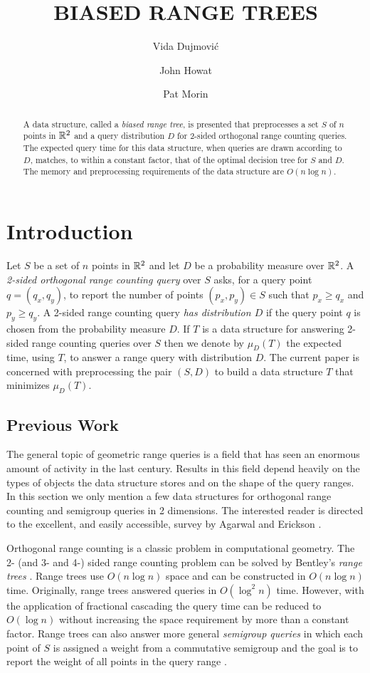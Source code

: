 \documentclass[lotsofwhite,charterfonts]{patmorin}
\title{\MakeUppercase{Biased Range Trees}}
\author{Vida Dujmovi\'c
	\and John Howat
	\and Pat Morin}
\begin{document}
\maketitle
\begin{abstract}
A data structure, called a \emph{biased range tree}, is presented that
preprocesses a set $S$ of $n$ points in $\mathbb{R}^2$ and a query
distribution $D$ for 2-sided orthogonal range counting queries.  The
expected query time for this data structure, when queries are drawn
according to $D$, matches, to within a constant factor, that of the
optimal decision tree for $S$ and $D$.   The memory and preprocessing
requirements of the data structure are $O(n\log n)$.
\end{abstract}

\section{Introduction}

Let $S$ be a set of $n$ points in $\mathbb{R}^2$ and let $D$ be a probability
measure over $\mathbb{R}^2$.  A \emph{2-sided orthogonal range counting query}
over $S$ asks, for a query point $q=(q_x,q_y)$, to report the number
of points $(p_x,p_y)\in S$ such that $p_x \ge q_x$ and $p_y \ge q_y$.
A 2-sided range counting query \emph{has distribution $D$} if the
query point $q$ is chosen from the probability measure $D$.  If $T$ is
a data structure for answering 2-sided range counting queries over $S$
then we denote by $\mu_D(T)$ the expected time, using $T$, to answer a
range query with distribution $D$.  The current paper is concerned
with preprocessing the pair $(S,D)$ to build a data structure $T$ that
minimizes $\mu_D(T)$.

\subsection{Previous Work}

The general topic of geometric range queries is a field that has seen
an enormous amount of activity in the last century.  Results in this
field depend heavily on the types of objects the data structure stores
and on the shape of the query ranges.  In this section we only mention
a few data structures for orthogonal range counting and semigroup
queries in 2 dimensions.  The interested reader is directed to the
excellent, and easily accessible, survey by Agarwal and Erickson
\cite{ea99}.

Orthogonal range counting is a classic problem in computational
geometry.  The 2- (and 3- and 4-) sided range counting problem can be
solved by Bentley's \emph{range trees} \cite{ae42}.  Range trees use
$O(n\log n)$ space and can be constructed in $O(n\log n)$ time.
Originally, range trees answered queries in $O(\log^2 n)$ time.
However, with the application of fractional cascading
\cite{ae76,ae196} the query time can be reduced to $O(\log n)$ without
increasing the space requirement by more than a constant factor.
Range trees can also answer more general \emph{semigroup queries} in
which each point of $S$ is assigned a weight from a commutative
semigroup and the goal is to report the weight of all points in the
query range \cite{ae133,ae292}.
\end{document}
